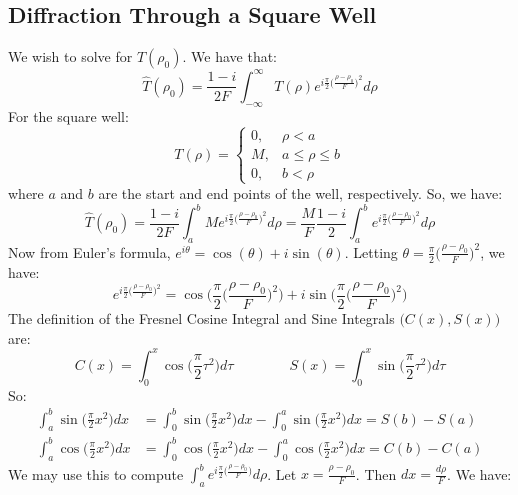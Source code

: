 \documentclass{article}
\theoremstyle{mystyle}
\begin{document}
\subsection{Diffraction Through a Square Well}
We wish to solve for $\hat{T}(\rho_{0})$. We have that:
\begin{equation*}
\hat{T}(\rho_0) = \frac{1-i}{2F}\int_{-\infty}^{\infty}T(\rho)e^{i\frac{\pi}{2}\big(\frac{\rho-\rho_0}{F}\big)^2}d\rho
\end{equation*}
For the square well:
\begin{equation*}
T(\rho) = \begin{cases} 0, & \rho<a \\ M, & a \leq \rho \leq b \\ 0, & b < \rho\end{cases}
\end{equation*}
where $a$ and $b$ are the start and end points of the well, respectively. So, we have:
\begin{equation*}
\hat{T}(\rho_0) = \frac{1-i}{2F}\int_{a}^{b}Me^{i\frac{\pi}{2}\big(\frac{\rho-\rho_0}{F}\big)^2}d\rho = \frac{M}{F}\frac{1-i}{2}\int_{a}^{b}e^{i\frac{\pi}{2}\big(\frac{\rho-\rho_0}{F}\big)^2}d\rho
\end{equation*}
Now from Euler's formula, $e^{i\theta} = \cos(\theta)+i\sin(\theta).$ Letting $\theta = \frac{\pi}{2}\big(\frac{\rho-\rho_0}{F}\big)^2$, we have:
\begin{equation*}
e^{i\frac{\pi}{2}\big(\frac{\rho-\rho_0}{F}\big)^2} = \cos\bigg(\frac{\pi}{2}\big(\frac{\rho-\rho_0}{F}\big)^2\bigg)+i\sin\bigg(\frac{\pi}{2}\big(\frac{\rho-\rho_0}{F}\big)^2\bigg)
\end{equation*}
The definition of the Fresnel Cosine Integral and Sine Integrals $\big(C(x),S(x)\big)$ are:
\begin{equation*}
C(x) = \int_{0}^{x} \cos\big(\frac{\pi}{2}\tau^2\big)d\tau \quad\quad\quad\quad S(x) = \int_{0}^{x} \sin\big(\frac{\pi}{2}\tau^2\big)d\tau
\end{equation*}
So:
\begin{align*}
\int_{a}^{b} \sin\bigg(\frac{\pi}{2}x^2\bigg)dx &= \int_{0}^{b}\sin\bigg(\frac{\pi}{2}x^2\bigg)dx - \int_{0}^{a}\sin\bigg(\frac{\pi}{2}x^2\bigg)dx = S(b) - S(a) \\
\int_{a}^{b} \cos\bigg(\frac{\pi}{2}x^2\bigg)dx &= \int_{0}^{b} \cos\bigg(\frac{\pi}{2}x^2\bigg)dx - \int_{0}^{a}\cos\bigg(\frac{\pi}{2}x^2\bigg)dx = C(b) - C(a)
\end{align*}
We may use this to compute $\int_{a}^{b} e^{i\frac{\pi}{2}\big(\frac{\rho-\rho_0}{F}\big)}d\rho$. Let $x=\frac{\rho-\rho_0}{F}$. Then $dx = \frac{d\rho}{F}$. We have:
\end{document}
